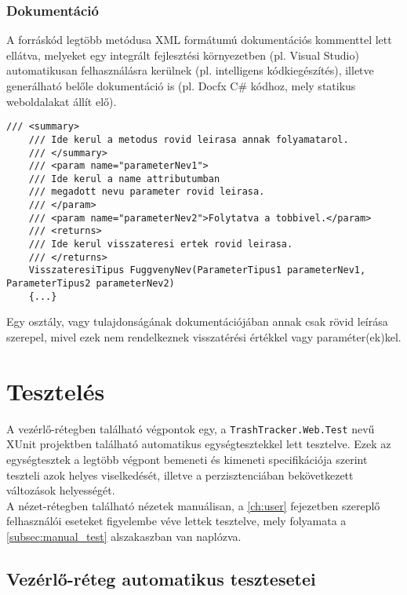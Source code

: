 \subsubsection{Dokumentáció}

A forráskód legtöbb metódusa XML formátumú dokumentációs kommenttel lett ellátva, melyeket egy integrált fejlesztési környezetben (pl. Visual Studio) automatikusan felhasználásra kerülnek (pl. intelligens kódkiegészítés), illetve generálható belőle dokumentáció is (pl. Docfx C\# kódhoz, mely statikus weboldalakat állít elő). \cite{xml-documentation}

\begin{lstlisting}[language={[Sharp]C}]
	/// <summary>
	/// Ide kerul a metodus rovid leirasa annak folyamatarol.
	/// </summary>
	/// <param name="parameterNev1">
	/// Ide kerul a name attributumban
	/// megadott nevu parameter rovid leirasa.
	/// </param>
	/// <param name="parameterNev2">Folytatva a tobbivel.</param>
	/// <returns>
	/// Ide kerul visszateresi ertek rovid leirasa.
	/// </returns>
	VisszateresiTipus FuggvenyNev(ParameterTipus1 parameterNev1, ParameterTipus2 parameterNev2)
	{...}
\end{lstlisting}

\begin{note}
	Egy osztály, vagy tulajdonságának dokumentációjában annak csak rövid leírása szerepel, mivel ezek nem rendelkeznek visszatérési értékkel vagy paraméter(ek)kel.
\end{note}

\section{Tesztelés}

A vezérlő-rétegben található végpontok egy, a \texttt{TrashTracker.Web.Test} nevű XUnit projektben található automatikus egységtesztekkel lett tesztelve. Ezek az egységtesztek a legtöbb végpont bemeneti és kimeneti specifikációja szerint teszteli azok helyes viselkedését, illetve a perzisztenciában bekövetkezett változások helyességét. \cite{xunit-overview}\\
A nézet-rétegben található nézetek manuálisan, a \ref{ch:user} fejezetben szereplő felhasználói eseteket figyelembe véve lettek tesztelve, mely folyamata a \ref{subsec:manual_test} alszakaszban van naplózva.

\subsection{Vezérlő-réteg automatikus tesztesetei}

